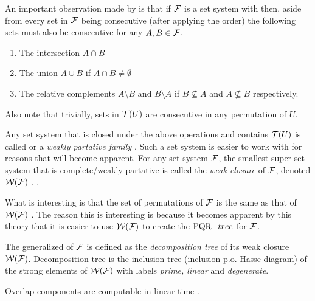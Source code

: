 An important observation made by \cite{mm96} is that if ${\cal F}$ is a set
system with \COP then, aside from every set in ${\cal F}$ being consecutive
(after applying the \COP order) the following sets must also be
consecutive for any $A, B \in {\cal F}$.
\begin{enumerate}
  \item The intersection $A \cap B$ 
  \item The union $A \cup B$ if $A \cap B \ne \emptyset$
  \item The relative complements $A \setminus B$ and $B \setminus A$
    if $B \nsubseteq A$ and $A \nsubseteq B$ respectively.
\end{enumerate}
Also note that trivially, sets in ${\cal T}(U)$ are consecutive in any
permutation of $U$.

Any set system that is closed under the above operations and contains
${\cal T}(U)$ is called {\complete} \cite{mm96} or a {\em weakly partative
  family} \cite{mcc04}. Such a set system is easier to
work with for reasons that will become apparent.
For any set system ${\cal F}$, the smallest super set system that is
complete/weakly partative is called the {\em weak closure} of ${\cal F}$,
denoted ${\cal W}({\cal F})$ \cite[Def.~3.2]{mcc04}. \cite[Def.~2, smallest {\em
  complete} supercollection]{mm96}.

What is interesting is that the set of \COP permutations of ${\cal F}$ is
the same as that of ${\cal W}({\cal F})$ \cite[Th.~3]{mm96}. The reason this is
interesting is because it becomes apparent by this theory that it is
easier to use ${\cal W}({\cal F})$ to create the $\PQRtree$ for ${\cal F}$.


The generalized \PQtree of ${\cal F}$ is defined as the {\em decomposition
  tree} of its weak closure ${\cal W}({\cal F})$. Decomposition tree is the
inclusion tree (inclusion p.o. Hasse diagram) of the strong elements
of ${\cal W}({\cal F})$ with labels {\em prime, linear} and {\em degenerate}.\cite{mcc04}



Overlap components are computable in linear time \cite{mm95,wlh92}.


